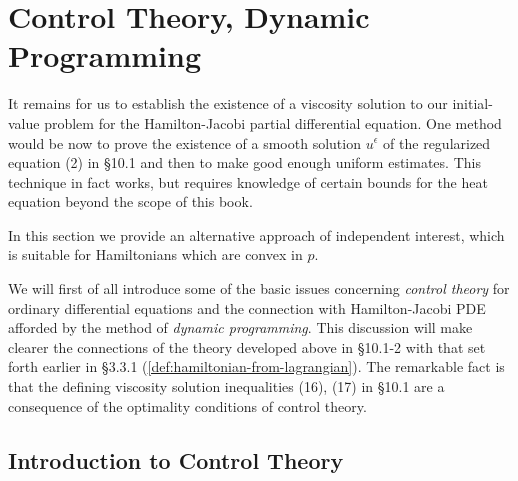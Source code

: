 \section{Control Theory, Dynamic Programming}
\label{sec:hj-control-theory-dynamic-programming}

It remains for us to establish the existence of a viscosity solution to our initial-value problem for the Hamilton-Jacobi partial differential equation. One method would be now to prove the existence of a smooth solution $u^{\epsilon}$ of the regularized equation (2) in \S10.1 and then to make good enough uniform estimates. This technique in fact works, but requires knowledge of certain bounds for the heat equation beyond the scope of this book.

In this section we provide an alternative approach of independent interest, which is suitable for Hamiltonians which are convex in $p$.

We will first of all introduce some of the basic issues concerning \textit{control theory} for ordinary differential equations and the connection with Hamilton-Jacobi PDE afforded by the method of \textit{dynamic programming}. This discussion will make clearer the connections of the theory developed above in \S10.1-2 with that set forth earlier in \S3.3.1 (\cref{def:hamiltonian-from-lagrangian}). The remarkable fact is that the defining viscosity solution inequalities (16), (17) in \S10.1 are a consequence of the optimality conditions of control theory.

\subsection{Introduction to Control Theory}

